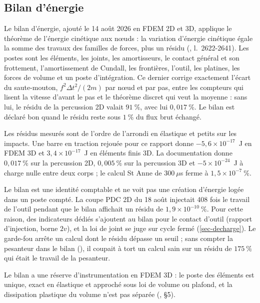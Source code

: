 \subsection{Bilan d'énergie}
\label{sec-B4}

Le bilan d'énergie, ajouté le 14 août 2026 en FDEM 2D et 3D, applique le théorème de l'énergie cinétique aux nœuds : la variation d'énergie cinétique égale la somme des travaux des familles de forces, plus un résidu (, l.~2622-2641). Les postes sont les éléments, les joints, les amortisseurs, le contact général et son frottement, l'amortissement de Cundall, les frontières, l'outil, les platines, les forces de volume et un poste d'intégration. Ce dernier corrige exactement l'écart du saute-mouton, $f^2\Delta t^2/(2m)$ par nœud et par pas, entre les compteurs qui lisent la vitesse d'avant le pas et le théorème discret qui veut la moyenne : sans lui, le résidu de la percussion 2D valait $91~\%$, avec lui $0{,}017~\%$. Le bilan est déclaré bon quand le résidu reste sous $1~\%$ du flux brut échangé.

Les résidus mesurés sont de l'ordre de l'arrondi en élastique et petits sur les impacts. Une barre en traction rejouée pour ce rapport donne $-5{,}6\times10^{-17}$~J en FDEM 3D et $3{,}4\times10^{-17}$~J en éléments finis 3D. La documentation donne $0{,}017~\%$ sur la percussion 2D, $0{,}005~\%$ sur la percussion 3D et $-5\times10^{-24}$~J à charge nulle entre deux corps ; le calcul St Anne de $300~\mu$s ferme à $1{,}5\times10^{-7}~\%$.

Le bilan est une identité comptable et ne voit pas une création d'énergie logée dans un poste compté. La coupe PDC 2D du 18 août injectait 408 fois le travail de l'outil pendant que le bilan affichait un résidu de $1{,}9\times10^{-10}~\%$. Pour cette raison, des indicateurs dédiés s'ajoutent au bilan pour le contact d'outil (rapport d'injection, borne $2v$), et la loi de joint se juge sur cycle fermé (\cref{sec-decharge}). Le garde-fou  arrête un calcul dont le résidu dépasse un seuil ; sans compter la pesanteur dans le bilan (), il coupait à tort un calcul sain sur un résidu de $175~\%$ qui était le travail de la pesanteur.

Le bilan a une réserve d'instrumentation en FDEM 3D : le poste des éléments est unique, exact en élastique et approché sous loi de volume ou plafond, et la dissipation plastique du volume n'est pas séparée (, §5).

